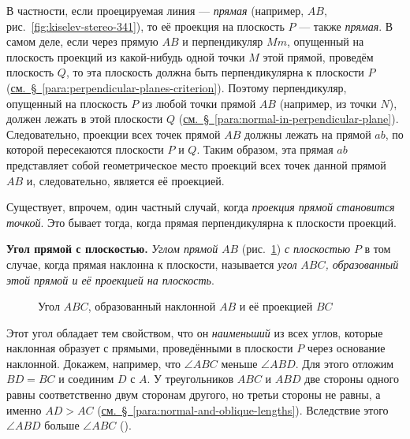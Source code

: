 В частности, если проецируемая линия --- \emph{прямая} (например, \(AB\), рис.~\ref{fig:kiselev-stereo-341}), то её проекция на плоскость \(P\) --- также \emph{прямая}. В самом деле, если через прямую \(AB\) и перпендикуляр \(Mm\), опущенный на плоскость проекций из какой-нибудь одной точки \(M\) этой прямой, проведём плоскость \(Q\), то эта плоскость должна быть перпендикулярна к плоскости \(P\) (\hyperref[para:perpendicular-planes-criterion]{см.~§~\ref*{para:perpendicular-planes-criterion}}). Поэтому перпендикуляр, опущенный на плоскость \(P\) из любой точки прямой \(AB\) (например, из точки \(N\)), должен лежать в этой плоскости \(Q\) (\hyperref[para:normal-in-perpendicular-plane]{см.~§~\ref*{para:normal-in-perpendicular-plane}}). Следовательно, проекции всех точек прямой \(AB\) должны лежать на прямой \(ab\), по которой пересекаются плоскости \(P\) и \(Q\). Таким образом, эта прямая \(ab\) представляет собой геометрическое место проекций всех точек данной прямой \(AB\) и, следовательно, является её проекцией.

Существует, впрочем, один частный случай, когда \emph{проекция прямой становится точкой}. Это бывает тогда, когда прямая перпендикулярна к плоскости проекций.

 \textbf{Угол прямой с плоскостью.} \emph{Углом прямой} \(AB\) (рис.~\ref{fig:kiselev-stereo-342}) \emph{с плоскостью} \(P\) в том случае, когда прямая наклонна к плоскости, называется \emph{угол} \(ABC\)\emph{, образованный этой прямой и её проекцией на плоскость}.

\begin{figure}[htbp]
    \centering
    \renewcommand{\thefigure}{342}
    \captionsetup{name=Рис.,labelsep=period}
    
    \caption{Угол \(ABC\), образованный наклонной \(AB\) и её проекцией \(BC\)}\label{fig:kiselev-stereo-342}
\end{figure}

Этот угол обладает тем свойством, что он \emph{наименьший} из всех углов, которые наклонная образует с прямыми, проведёнными в плоскости \(P\) через основание наклонной. Докажем, например, что \(\angle ABC\) меньше \(\angle ABD\). Для этого отложим \(BD=BC\) и соединим \(D\) с \(A\). У треугольников \(ABC\) и \(ABD\) две стороны одного равны соответственно двум сторонам другого, но третьи стороны не равны, а именно \(AD>AC\) (\hyperref[para:normal-and-oblique-lengths]{см.~§~\ref*{para:normal-and-oblique-lengths}}). Вследствие этого \(\angle ABD\) больше \(\angle ABC\) ().

\clearpage
\endgroup
